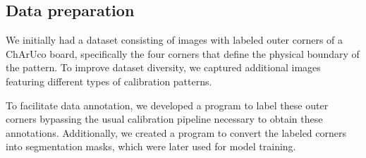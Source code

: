 \subsection{Data preparation}

%
%

We initially had a dataset consisting of images with labeled outer corners of a ChArUco board, specifically the four corners that
define the physical boundary of the pattern. To improve dataset diversity, we captured additional images featuring different types of
calibration patterns.

To facilitate data annotation, we developed a program to label these outer corners bypassing the usual calibration pipeline necessary
to obtain these annotations. Additionally, we created a program to convert the labeled corners into segmentation masks, which were
later used for model training.
